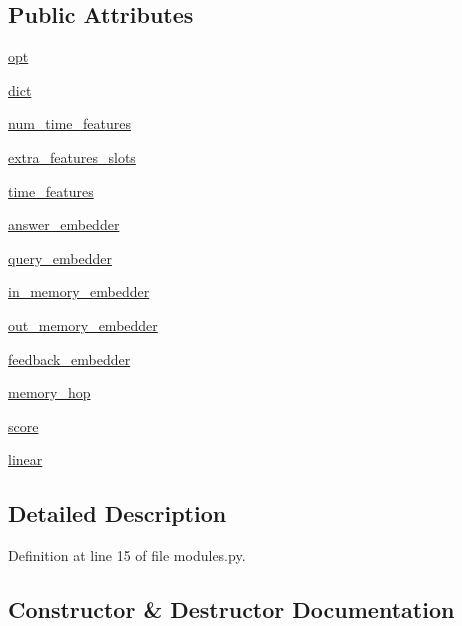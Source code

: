\subsection*{Public Attributes}
\begin{DoxyCompactItemize}
\item 
\hyperlink{classagent_1_1modules_1_1MemNN_acade9312ce9292bf44d4e1b70c8f9b73}{opt}
\item 
\hyperlink{classagent_1_1modules_1_1MemNN_a141cdf0a3d28af1cfc47b9990abc74c6}{dict}
\item 
\hyperlink{classagent_1_1modules_1_1MemNN_a8a0039c69aeff10be21612d967459c32}{num\+\_\+time\+\_\+features}
\item 
\hyperlink{classagent_1_1modules_1_1MemNN_a3fe1dbdb20b36d425585aa5ede13acf9}{extra\+\_\+features\+\_\+slots}
\item 
\hyperlink{classagent_1_1modules_1_1MemNN_a9fb8309c555b3c48d1c9f3a711efd8c3}{time\+\_\+features}
\item 
\hyperlink{classagent_1_1modules_1_1MemNN_a74a3f3cf77641fd404808cc8820e4ae6}{answer\+\_\+embedder}
\item 
\hyperlink{classagent_1_1modules_1_1MemNN_ac0718034c9a8f595e0f138fc73c20a80}{query\+\_\+embedder}
\item 
\hyperlink{classagent_1_1modules_1_1MemNN_aca43b3c9bf63ef6680b6f6c19d0e90eb}{in\+\_\+memory\+\_\+embedder}
\item 
\hyperlink{classagent_1_1modules_1_1MemNN_a439ffece4195cb7ca400c19f79db7f92}{out\+\_\+memory\+\_\+embedder}
\item 
\hyperlink{classagent_1_1modules_1_1MemNN_a4ae16569ac7ba30d2e3838f5431c0e28}{feedback\+\_\+embedder}
\item 
\hyperlink{classagent_1_1modules_1_1MemNN_a27157e41457032bacb043bcaf9640c73}{memory\+\_\+hop}
\item 
\hyperlink{classagent_1_1modules_1_1MemNN_a3fcb2d3675f76c96af9962b08193c6ec}{score}
\item 
\hyperlink{classagent_1_1modules_1_1MemNN_a63e1eea8835a674f6df4a0f86ac71647}{linear}
\end{DoxyCompactItemize}


\subsection{Detailed Description}


Definition at line 15 of file modules.\+py.



\subsection{Constructor \& Destructor Documentation}
\mbox{\label{classagent_1_1modules_1_1MemNN_afa7eea8fb77c75602a7b58afce74f31c}} 
